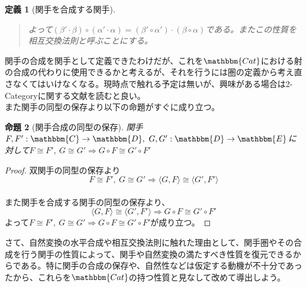 \documentclass[uplatex,dvipdfmx]{jsarticle}
\newcommand{\cat}[1]{\mathbbm{#1}}
\newcommand{\arrow}{\rightarrow}
\newcommand{\functor}[3]{#1:\cat{#2}\arrow \cat{#3}}
\newcommand{\tuple}[1]{\langle #1\rangle}
\newtheorem{proof}{証明}[section]
\newtheorem{prop}[proof]{命題}
\newtheorem{define}[proof]{定義}
\numberwithin{proof}{subsection}
\newenvironment{mydescription}
{\begin{description}
  \setlength{\parskip}{0.5cm}
}
{\end{description}}
\begin{document}
\begin{define}[関手を合成する関手]
\begin{quote}
\begin{mydescription}
\begin{center}
\begin{tikzpicture}[auto]
      \end{tikzpicture}
    \end{center}
    よって$(\beta'\cdot\beta)\circ(\alpha'\cdot\alpha)=(\beta'\circ\alpha')\cdot(\beta\circ\alpha)$である。またこの性質を相互交換法則と呼ぶことにする。
		\end{mydescription}
		\end{quote}
  \end{define}
  関手の合成を関手として定義できたわけだが、これを$\cat{Cat}$における射の合成の代わりに使用できるかと考えるが、それを行うには圏の定義から考え直さなくてはいけなくなる。現時点で触れる予定は無いが、興味がある場合は2-Categoryに関する文献を読むと良い。\\
  また関手の同型の保存より以下の命題がすぐに成り立つ。
  \begin{prop}[関手合成の同型の保存]
    関手$\functor{F,F'}{C}{D},\ \functor{G,G'}{D}{E}$に対して$F\cong F',\ G\cong G'\Longrightarrow G\circ F\cong G'\circ F'$
  \end{prop}
  \begin{proof}
    双関手の同型の保存より\[F\cong F',\ G\cong G'\Longrightarrow\tuple{G,F}\cong\tuple{G',F'}\]\\
    また関手を合成する関手の同型の保存より、\[\tuple{G,F}\cong\tuple{G',F'}\Longrightarrow G\circ F\cong G'\circ F'\]
    よって$F\cong F',\ G\cong G'\Longrightarrow G\circ F\cong G'\circ F'$が成り立つ。
  \end{proof}
  さて、自然変換の水平合成や相互交換法則に触れた理由として、関手圏やその合成を行う関手の性質によって、関手や自然変換の満たすべき性質を復元できるからである。特に関手の合成の保存や、自然性などは仮定する動機が不十分であったから、これらを$\cat{Cat}$の持つ性質と見なして改めて導出しよう。\\
\end{document}
